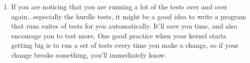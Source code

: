 \documentclass{article}
\begin{document}
\begin{enumerate}
  \item If you are noticing that you are running a lot of the tests over and over again...especially
  the hurdle tests, it might be a good idea to write a program that runs suites of tests for you automatically.
  It'll save you time, and also encourage you to test more. One good practice when your kernel starts
  getting big is to run a set of tests every time you make a change, so if your change breaks something,
  you'll immediately know.
\end{enumerate}
\end{document}
